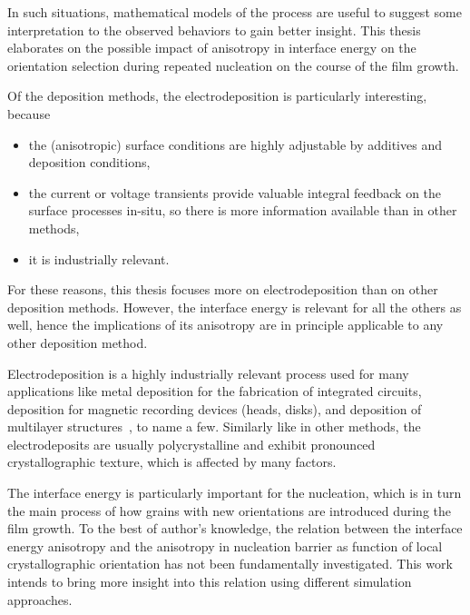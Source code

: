 In such situations, mathematical models of the process are useful to suggest some interpretation to the observed behaviors to gain better insight. This thesis elaborates on the possible impact of anisotropy in interface energy on the orientation selection during repeated nucleation on the course of the film growth. 

Of the deposition methods, the electrodeposition is particularly interesting, because
\begin{itemize}
	\item the (anisotropic) surface conditions are highly adjustable by additives and deposition conditions,
	\item the current or voltage transients provide valuable integral feedback on the surface processes in-situ, so there is more information available than in other methods,
	\item it is industrially relevant.
\end{itemize}
For these reasons, this thesis focuses more on electrodeposition than on other deposition methods. However, the interface energy is relevant for all the others as well, hence the implications of its anisotropy are in principle applicable to any other deposition method. 

Electrodeposition is a highly industrially relevant process used for many applications like metal deposition for the fabrication of integrated circuits, deposition for magnetic recording devices (heads, disks), and deposition
of multilayer structures~\cite{Schlesinger2006}, to name a few. Similarly like in other methods, the electrodeposits are usually polycrystalline and exhibit pronounced crystallographic texture, which is affected by many factors. 

The interface energy is particularly important for the nucleation, which is in turn the main process of how grains with new orientations are introduced during the film growth. To the best of author's knowledge, the relation between the interface energy anisotropy and the anisotropy in nucleation barrier as function of local crystallographic orientation has not been fundamentally investigated. This work intends to bring more insight into this relation using different simulation approaches.





